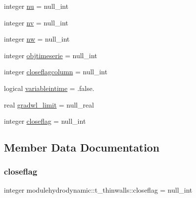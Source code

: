 \begin{DoxyCompactItemize}
\item 
integer \mbox{\hyperlink{structmodulehydrodynamic_1_1t__thinwalls_a99ca3cc39cd877d1600fe9b7d25eae4f}{nu}} = null\+\_\+int
\item 
integer \mbox{\hyperlink{structmodulehydrodynamic_1_1t__thinwalls_a8f08b979d76eb1ba1b3f788921eecd85}{nv}} = null\+\_\+int
\item 
integer \mbox{\hyperlink{structmodulehydrodynamic_1_1t__thinwalls_a7a541117505a9a268981a91c6a564f49}{nw}} = null\+\_\+int
\item 
integer \mbox{\hyperlink{structmodulehydrodynamic_1_1t__thinwalls_a7c2b338020115ace04a55f62250c529f}{objtimeserie}} = null\+\_\+int
\item 
integer \mbox{\hyperlink{structmodulehydrodynamic_1_1t__thinwalls_af1d69a981c28a00d50b6848903e0871f}{closeflagcolumn}} = null\+\_\+int
\item 
logical \mbox{\hyperlink{structmodulehydrodynamic_1_1t__thinwalls_a874d8dd15eb25929ff8982ac1824e78a}{variableintime}} = .false.
\item 
real \mbox{\hyperlink{structmodulehydrodynamic_1_1t__thinwalls_a2e958c853278e354649521d8dc3464eb}{gradwl\+\_\+limit}} = null\+\_\+real
\item 
integer \mbox{\hyperlink{structmodulehydrodynamic_1_1t__thinwalls_a73442cd0faf61a4197383c736b43c5c4}{closeflag}} = null\+\_\+int
\end{DoxyCompactItemize}


\subsection{Member Data Documentation}
\mbox{\label{structmodulehydrodynamic_1_1t__thinwalls_a73442cd0faf61a4197383c736b43c5c4}} 
\subsubsection{\texorpdfstring{closeflag}{closeflag}}
{\footnotesize\ttfamily integer modulehydrodynamic\+::t\+\_\+thinwalls\+::closeflag = null\+\_\+int\hspace{0.3cm}{\ttfamily [private]}}

\mbox{\label{structmodulehydrodynamic_1_1t__thinwalls_af1d69a981c28a00d50b6848903e0871f}} 
